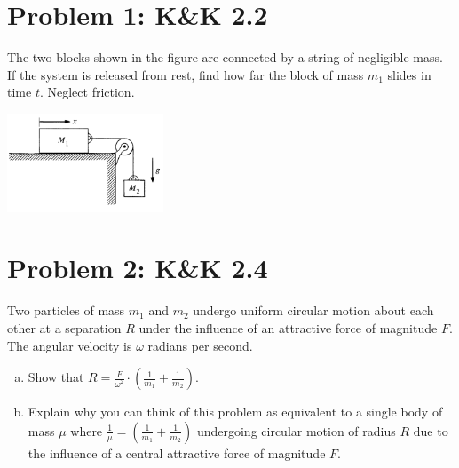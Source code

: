 \documentclass[problems]{esg8012pset}
\date{September 17}
\begin{document}
\section*{Problem 1: K\&K 2.2}
  The two blocks shown in the figure are connected by a string of negligible mass. If the system is released from rest, find how far the block of mass $m_1$ slides in time $t$. Neglect friction.
  \begin{center}\includegraphics[width=0.35\textwidth]{ps02_1}\end{center}
\section*{Problem 2: K\&K 2.4}
  Two particles of mass $m_1$ and $m_2$ undergo uniform circular motion about each other at a separation $R$ under the influence of an attractive force of magnitude $F$.  The angular velocity is $\omega$ radians per second.
  \begin{enumerate}[a)]
    \item Show that $R = \frac{F}{\omega^2} \cdot \left(\frac{1}{m_1} + \frac{1}{m_2}\right)$.
    \item Explain why you can think of this problem as equivalent to a single body of mass $\mu$ where $\frac{1}{\mu} = \left(\frac{1}{m_1} + \frac{1}{m_2}\right)$ undergoing circular motion of radius $R$ due to the influence of a central attractive force of magnitude $F$.
  \end{enumerate}
\end{document}
